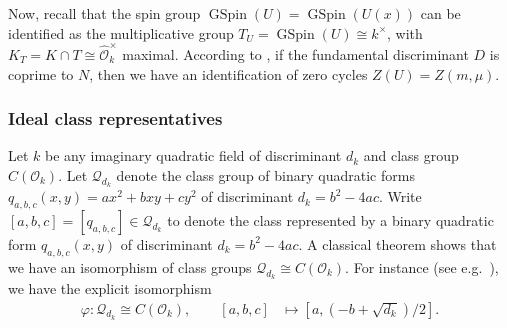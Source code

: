 \documentclass{amsart}
\theoremstyle{definition}
\theoremstyle{definition}
\theoremstyle{definition}
\begin{document}
Now, recall that the spin group $\operatorname{GSpin}(U) = \operatorname{GSpin}(U(x))$ 
can be identified as the multiplicative group $T_U = \operatorname{GSpin}(U) \cong k^{\times}$,
with $K_T = K \cap T \cong \widehat{\mathcal{O}}_k^{\times}$ maximal. 
According to \cite[Proposition 7.2]{BY}, if the fundamental discriminant
$D$ is coprime to $N$, then we have an identification of zero cycles $Z(U) = Z(m, \mu)$. 
 
\subsubsection{Ideal class representatives} 
 
Let $k$ be any imaginary quadratic field of discriminant $d_k$ and class group $C(\mathcal{O}_k)$.  
Let $\mathcal{Q}_{d_k}$ denote the class group of binary quadratic forms $q_{a,b,c}(x,y)=ax^2 +bxy + c y^2$ 
of discriminant $d_k = b^2 - 4ac$. Write $[a, b, c] = [q_{a, b, c}] \in \mathcal{Q}_{d_k}$ to denote the class
represented by a binary quadratic form $q_{a, b, c}(x, y)$ of discriminant $d_k = b^2 - 4ac$.
A classical theorem shows that we have an isomorphism of class groups $\mathcal{Q}_{d_k} \cong C(\mathcal{O}_k)$. 
For instance (see e.g.~\cite[Theorem 7.7]{Cox}), we have the explicit isomorphism
\begin{align*} \varphi: \mathcal{Q}_{d_k} \cong C(\mathcal{O}_k), \quad \quad [a, b, c] &\longmapsto [ a, (-b + \sqrt{d_k})/2 ]. \end{align*}
 
\end{document}
